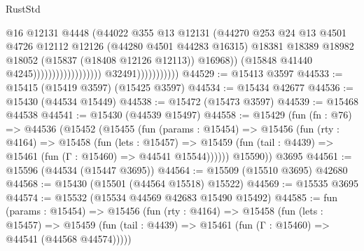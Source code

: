 \begin{lexlean}{RustStd}
\begin{coremodule}
                                                            @16
                                                            @12131
                                                            @4448
                                                            (@44022
                                                              @355
                                                              @13
                                                              @12131
                                                              (@44270
                                                                @253
                                                                @24
                                                                @13
                                                                @4501
                                                                @4726
                                                                @12112
                                                                @12126
                                                                (@44280 @4501 @44283 @16315)
                                                                @18381
                                                                @18389
                                                                @18982
                                                                @18052
                                                                (@15837 (@18408 @12126 @12113))
                                                                @16968))
                                                            (@15848 @41440 @4245))))))))))))))))))
                          @32491)))))))))))
@44529 := @15413 @3597
@44533 := @15415 (@15419 @3597) (@15425 @3597)
@44534 := @15434 @42677
@44536 := @15430 (@44534 @15449)
@44538 := @15472 (@15473 @3597)
@44539 := @15468 @44538
@44541 := @15430 (@44539 @15497)
@44558 := @15429
    (fun (fn : @76) =>
    @44536
      (@15452
        (@15455
          (fun (params : @15454) =>
          @15456
            (fun (rty : @4164) =>
            @15458
              (fun (lets : @15457) =>
              @15459 (fun (tail : @4439) => @15461 (fun (Γ : @15460) => @44541 @15544))))))
        @15590))
    @3695
@44561 := @15596 (@44534 (@15447 @3695))
@44564 := @15509 (@15510 @3695) @42680
@44568 := @15430 (@15501 (@44564 @15518) @15522)
@44569 := @15535 @3695
@44574 := @15532 (@15534 @44569 @42683 @15490 @15492)
@44585 := fun (params : @15454) =>
  @15456
    (fun (rty : @4164) =>
    @15458
      (fun (lets : @15457) =>
      @15459 (fun (tail : @4439) => @15461 (fun (Γ : @15460) => @44541 (@44568 @44574)))))

\end{coremodule}
\end{lexlean}

